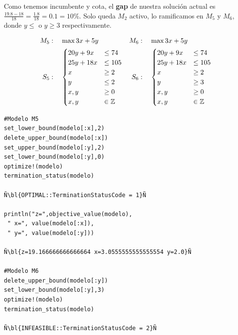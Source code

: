     Como tenemos incumbente y cota, el \textbf{gap} de nuestra solución actual  es $\frac{19.8-18}{18}=\frac{1.8}{18}=0.1=10\%$. Solo queda $M_2$ activo, lo ramificamos en $M_5$ y $M_6$, donde $y\leq$ o $y\geq3$ respectivamente. 
    
    \NAM{\begin{center}}{}
    \begin{minipage}{0.4\textwidth}
    	\begin{align*}
    	M_5&:\quad 	\max 3x+5y & M_6&:\quad 	\max 3x+5y\\ 
    	S_5&:\quad \begin{cases}
    	20y+9x&\leq 74\\
    	25y+18x&\leq 105\\
    	x&\geq 2\\
    	y&\leq 2\\
    	x,y&\geq 0\\
    	x,y&\in \mathbb Z\end{cases}&S_6&:\quad \begin{cases}
    	20y+9x&\leq 74\\
    	25y+18x&\leq 105\\
    	x&\geq 2\\
    	y&\geq 3\\
    	x,y&\geq 0\\
    	x,y&\in \mathbb Z\end{cases}
    	\end{align*}
    \end{minipage}
    \NAM{\end{center}}{}
    \begin{lstlisting}[escapechar=Ñ]
#Modelo M5
set_lower_bound(modelo[:x],2)
delete_upper_bound(modelo[:x])
set_upper_bound(modelo[:y],2) 
set_lower_bound(modelo[:y],0)
optimize!(modelo)
termination_status(modelo)

Ñ\bl{OPTIMAL::TerminationStatusCode = 1}Ñ

println("z=",objective_value(modelo),
 " x=", value(modelo[:x]),
 " y=", value(modelo[:y]))

Ñ\bl{z=19.166666666666664 x=3.0555555555555554 y=2.0}Ñ

#Modelo M6
delete_upper_bound(modelo[:y])
set_lower_bound(modelo[:y],3) 
optimize!(modelo)
termination_status(modelo)

Ñ\bl{INFEASIBLE::TerminationStatusCode = 2}Ñ
    \end{lstlisting}
    \NAM{
    \end{minipage}
    \end{center}
    }{
    \end{minipage}
    }
    
